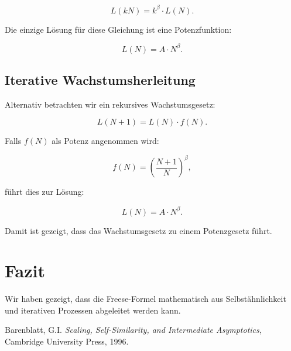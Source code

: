 \documentclass[a4paper,12pt]{article}
\begin{document}
\begin{equation}
    L(kN) = k^\beta \cdot L(N).
\end{equation}

Die einzige Lösung für diese Gleichung ist eine Potenzfunktion:

\begin{equation}
    L(N) = A \cdot N^\beta.
\end{equation}

\subsection{Iterative Wachstumsherleitung}
Alternativ betrachten wir ein rekursives Wachstumsgesetz:

\begin{equation}
    L(N+1) = L(N) \cdot f(N).
\end{equation}

Falls \( f(N) \) als Potenz angenommen wird:

\begin{equation}
    f(N) = \left( \frac{N+1}{N} \right)^\beta,
\end{equation}

führt dies zur Lösung:

\begin{equation}
    L(N) = A \cdot N^\beta.
\end{equation}

Damit ist gezeigt, dass das Wachstumsgesetz zu einem Potenzgesetz führt.

\section{Fazit}
Wir haben gezeigt, dass die Freese-Formel mathematisch aus Selbstähnlichkeit und iterativen Prozessen abgeleitet werden kann.

\begin{thebibliography}{9}
 Barenblatt, G.I. \textit{Scaling, Self-Similarity, and Intermediate Asymptotics}, Cambridge University Press, 1996.
\end{thebibliography}
\end{document}
